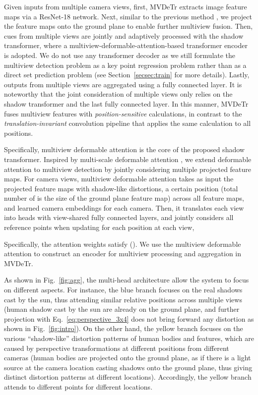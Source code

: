 \documentclass[sigconf,authorversion,nonacm]{acmart}
\begin{document}
Given inputs from multiple camera views, first, MVDeTr extracts image feature maps via a ResNet-18 \cite{he2016deep} network. Next, similar to the previous method \cite{hou2020multiview}, we project the feature maps onto the ground plane to enable further multiview fusion. Then, cues from multiple views are jointly and adaptively processed with the shadow transformer, where a multiview-deformable-attention-based transformer encoder is adopted. We do not use any transformer decoder as we still formulate the multiview detection problem as a key point regression problem \cite{law2018cornernet,zhou2019objects} rather than as a direct set prediction problem \cite{carion2020end} (see Section~\ref{secsec:train} for more details). Lastly, outputs from multiple views are aggregated using a fully connected layer. 
It is noteworthy that the joint consideration of multiple views only relies on the shadow transformer and the last fully connected layer. In this manner, MVDeTr fuses multiview features with \textit{position-sensitive} calculations, in contrast to the \textit{translation-invariant} convolution pipeline that applies the same calculation to all positions. 

Specifically, multiview deformable attention is the core of the proposed shadow transformer. Inspired by multi-scale deformable attention \cite{zhu2021deformable}, we extend deformable attention to multiview detection by jointly considering multiple projected feature maps. 
For  camera views, multiview deformable attention takes as input the projected feature maps  with shadow-like distortions, a certain position  (total number of  is the size of the ground plane feature map) across all  feature maps, and learned camera embeddings for each camera. Then, it translates each view into  heads with view-shared fully connected layers, and jointly considers all  reference points when updating for each position at each view, 

Specifically, the attention weights satisfy ().
We use the multiview deformable attention to construct an encoder for multiview processing and aggregation in MVDeTr. 

As shown in Fig.~\ref{fig:agg}, the multi-head architecture allow the system to focus on different aspects. 
For instance, the blue branch focuses on the real shadows cast by the sun, thus attending similar relative positions across multiple views (human shadow cast by the sun are already on the ground plane, and further projection with Eq.~\ref{eq:perspective_3x4} does not bring forward any distortion as shown in Fig.~\ref{fig:intro}).
On the other hand, the yellow branch focuses on the various ``shadow-like'' distortion patterns of human bodies and features, which are caused by perspective transformations at different positions from different cameras
(human bodies are projected onto the ground plane, as if there is a light source at the camera location casting shadows onto the ground plane, thus giving distinct distortion patterns at different locations). Accordingly, the yellow branch attends to different points for different locations. 
\end{document}
